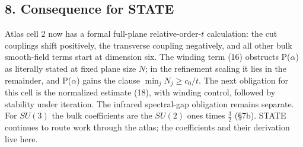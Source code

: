 \documentclass[11pt,a4paper]{article}
\begin{document}
\hypertarget{consequence-for-state}{%
\subsection{8. Consequence for STATE}\label{consequence-for-state}}

Atlas cell 2 now has a formal full-plane relative-order-\(t\)
calculation: the cut couplings shift positively, the transverse coupling
negatively, and all other bulk smooth-field terms start at dimension
six. The winding term (16) obstructs P(\(\alpha\)) as literally stated
at fixed plane size \(N\); in the refinement scaling it lies in the
remainder, and P(\(\alpha\)) gains the clause \(\min_jN_j\ge c_0/t\).
The next obligation for this cell is the normalized estimate (18), with
winding control, followed by stability under iteration. The infrared
spectral-gap obligation remains separate. For \(SU(3)\) the bulk
coefficients are the \(SU(2)\) ones times \(\frac32\) (§7b). STATE
continues to route work through the atlas; the coefficients and their
derivation live here.
\end{document}
